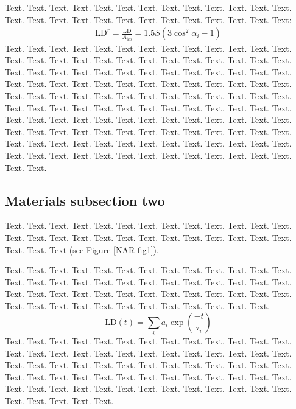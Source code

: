 \documentclass[a4,center,fleqn]{NAR}
\begin{document}
Text. Text. Text. Text. Text. Text. Text. Text. Text. Text. Text.
Text. Text. Text. Text. Text. Text. Text. Text. Text. Text. Text.
Text. Text. Text. Text:
\begin{align}
\mathrm{LD}^r = \frac{\mathrm{LD}}{A_\mathrm{iso}}
= 1.5 S \left( 3 \cos^2 \alpha_i - 1 \right)
\end{align}
Text. Text. Text. Text. Text. Text. Text. Text. Text. Text. Text.
Text. Text. Text. Text. Text. Text. Text. Text. Text. Text. Text.
Text. Text. Text. Text. Text. Text. Text. Text. Text. Text. Text.
Text. Text. Text. Text. Text. Text. Text. Text. Text. Text. Text.
Text. Text. Text. Text. Text. Text. Text. Text. Text. Text. Text.
Text. Text. Text. Text. Text. Text. Text. Text. Text. Text. Text.
Text. Text. Text. Text. Text. Text. Text. Text. Text. Text. Text.
Text. Text. Text. Text. Text. Text. Text. Text. Text. Text. Text.
Text. Text. Text. Text. Text. Text. Text. Text. Text. Text. Text.
Text. Text. Text. Text. Text. Text. Text. Text. Text. Text. Text.
Text. Text. Text. Text. Text. Text. Text. Text. Text. Text. Text.
Text. Text. Text. Text. Text. Text. Text. Text. Text. Text. Text.


\subsection{Materials subsection two}

Text. Text. Text. Text. Text. Text. Text. Text. Text. Text. Text.
Text. Text. Text. Text. Text. Text. Text. Text. Text. Text. Text.
Text. Text. Text. Text. Text. Text. Text
(see Figure \ref{NAR-fig1}).

Text. Text. Text. Text. Text. Text. Text. Text. Text. Text. Text.
Text. Text. Text. Text. Text. Text. Text. Text. Text. Text. Text.
Text. Text. Text. Text. Text. Text. Text. Text. Text. Text. Text.
Text. Text. Text. Text. Text. Text. Text. Text. Text. Text. Text.
Text. Text. Text. Text. Text. Text. Text.
\begin{equation*}
\mathrm{LD} \left( t \right) =
\sum\limits_i
a_i \exp \left( \frac{-t}{\tau_i} \right)
\end{equation*}
Text. Text. Text. Text. Text. Text. Text. Text. Text. Text. Text.
Text. Text. Text. Text. Text. Text. Text. Text. Text. Text. Text.
Text. Text. Text. Text. Text. Text. Text. Text. Text. Text. Text.
Text. Text. Text. Text. Text. Text. Text. Text. Text. Text. Text.
Text. Text. Text. Text. Text. Text. Text. Text. Text. Text. Text.
Text. Text. Text. Text. Text. Text. Text. Text. Text. Text. Text.
Text. Text. Text. Text.
\end{document}
